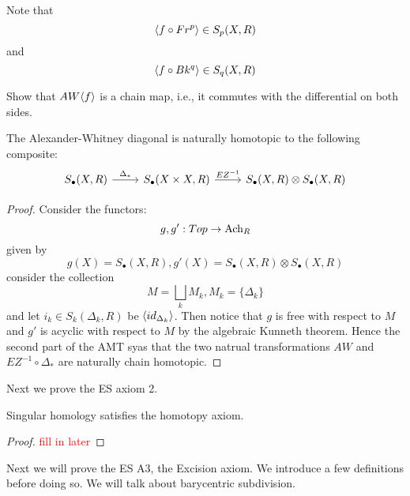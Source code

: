 Note that 
\begin{equation*}
    \langle f\circ Fr^p\rangle\in S_p(X,R)
\end{equation*}
and 
\begin{equation*}
    \langle f\circ Bk^q\rangle\in S_q(X,R)
\end{equation*}
\begin{prob}[HW(3.3)]
    Show that $AW\langle f\rangle$ is a chain map, i.e., it commutes with the differential on both sides.
\end{prob}
\begin{thm}
    The Alexander-Whitney diagonal is naturally homotopic to the following composite:
    \[\begin{tikzcd}
        {S_\bullet(X,R)} & {S_\bullet(X\times X,R)} & {S_\bullet(X,R)\otimes S_\bullet(X,R)}
        \arrow["{\Delta_*}", from=1-1, to=1-2]
        \arrow["{EZ^{-1}}", from=1-2, to=1-3]
    \end{tikzcd}\]
\end{thm}
\begin{proof}
    Consider the functors:
    \begin{equation*}
        g,g':Top\to\text{Ach}_R
    \end{equation*}
    given by 
    \begin{equation*}
        g(X)=S_\bullet(X,R), g'(X)=S_\bullet(X,R)\otimes S_\bullet(X,R)
    \end{equation*}
    consider the collection 
    \begin{equation*}
        M=\bigsqcup_k M_k, M_k=\{\Delta_k\}
    \end{equation*}
    and let $i_k\in S_k(\Delta_k,R)$ be $\langle id_{\Delta_k}\rangle$. Then notice that $g$ is free with respect to $M$ and $g'$ is acyclic with respect to $M$ by the algebraic Kunneth theorem. Hence the second part of the AMT syas that the two natrual transformations $AW$ and $EZ^{-1}\circ\Delta_*$ are naturally chain homotopic.
\end{proof}
Next we prove the ES axiom 2.
\begin{prop}
    Singular homology satisfies the homotopy axiom.
\end{prop}
\begin{proof}
    \textcolor{red}{fill in later}
\end{proof} 
Next we will prove the ES A3, the Excision axiom. We introduce a few definitions before doing so. We will talk about barycentric subdivision.

